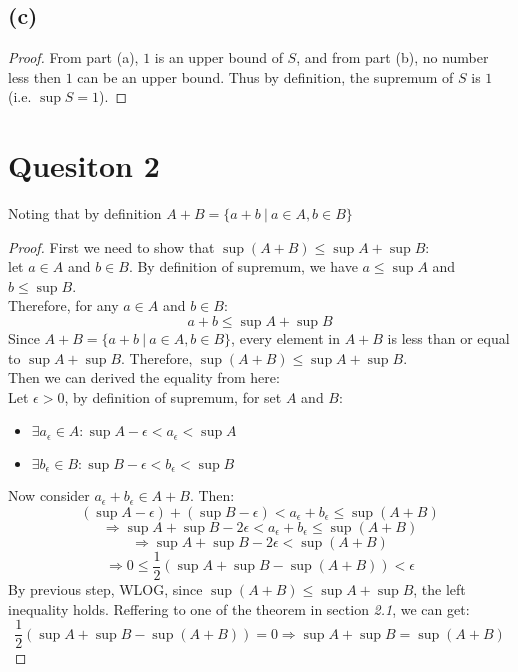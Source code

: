 \documentclass{article}
\begin{document}
\subsection*{(c)}
\begin{proof}
    From part (a), $1$ is an upper bound of $S$, and from part (b), no number less then $1$ can be an upper bound.
    Thus by definition, the supremum of $S$ is $1$ (i.e. $\sup S = 1$).
\end{proof}


\section*{Quesiton 2}
Noting that by definition \( A + B = \{ a + b \ | \ a \in A, b \in B \} \)

\begin{proof}
    First we need to show that \( \sup(A + B) \leq \sup A + \sup B \):
    \\
    let $a \in A$ and $b \in B$. By definition of supremum, we have $a \leq \sup A$ and $b \leq \sup B$.
    \\
    Therefore, for any $a \in A$ and $b \in B$:
    \[ a + b \leq \sup A + \sup B \]
    Since \( A + B = \{ a + b \ | \ a \in A, b \in B \} \), every element in $A + B$ is less than or equal to $\sup A + \sup B$.
    Therefore, \( \sup(A + B) \leq \sup A + \sup B \).
    \\
    Then we can derived the equality from here:
    \\
    Let $\epsilon > 0$, by definition of supremum, for set $A$ and $B$:
    \begin{itemize}
        \item \( \exists a_{\epsilon} \in A : \sup A - \epsilon < a_{\epsilon} < \sup A \)
        \item \( \exists b_{\epsilon} \in B : \sup B - \epsilon < b_{\epsilon} < \sup B \)
    \end{itemize}
    Now consider $a_{\epsilon} + b_{\epsilon} \in A + B$. Then:
    \[ (\sup A - \epsilon) + (\sup B - \epsilon) < a_{\epsilon} + b_{\epsilon} \leq \sup (A + B) \]
    \[ \Rightarrow \sup A + \sup B - 2 \epsilon < a_{\epsilon} + b_{\epsilon} \leq \sup (A + B) \]
    \[ \Rightarrow \sup A + \sup B - 2 \epsilon < \sup (A + B) \]
    \[ \Rightarrow 0 \leq \frac{1}{2}(\sup A + \sup B - \sup(A + B)) < \epsilon \]
    By previous step, WLOG, since \( \sup(A + B) \leq \sup A + \sup B \), the left inequality holds.
    Reffering to one of the theorem in section \textit{2.1}, we can get:
    \[ \frac{1}{2}(\sup A + \sup B - \sup(A + B)) = 0 \Rightarrow \sup A + \sup B = \sup(A + B) \]
\end{proof}
\end{document}
